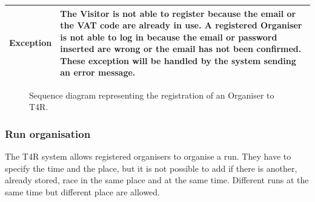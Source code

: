 \begin{table}[H]
\begin{tabular}{|p{3cm}|p{8.2cm}|}
                     \hline
                    \textbf{Exception} & The Visitor is not able to register because the email or the VAT code are already in use. \newline
                                         A registered Organiser is not able to log in because the email or password inserted are wrong or the email has not been confirmed. \newline
                                         These exception will be handled by the system sending an error message. \\
                                         \hline
                \end{tabular}  
            \end{table}
            
            \begin{figure}[H]
                \centering
                \caption{Sequence diagram representing the registration of an Organiser to T4R.}
                \label{fig:Organiser-registration-sequence-diagram}
            \end{figure}
            
        \subsubsection{Run organisation}
            
            The T4R system allows registered organisers to organise a run. They have to specify the time and the place, but it is not possible to add if there is another, already stored, race in the same place and at the same time. Different runs at the same time but different place are allowed.
            
